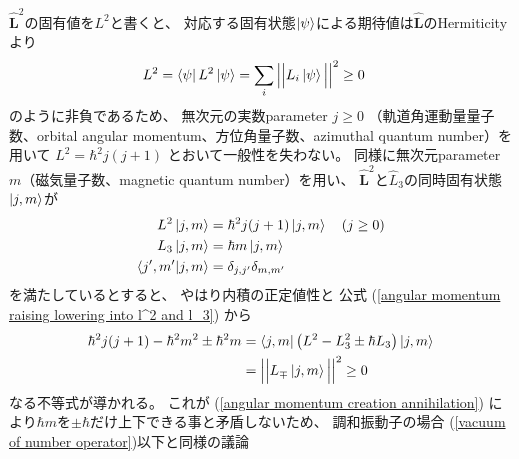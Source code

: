 $\hat{\bm{L}}^2$の固有値を$L^2$と書くと、
対応する固有状態$\ket{\psi}$による期待値は$\hat{\bm{L}}$のHermiticityより
\begin{align}
    L^2
&=
    \bra{\psi} L^2 \ket{\psi}
=
    \sum_i
    \Big|\Big|
        L_i \ket{\psi}
    \Big|\Big|^2 \ge 0
\end{align}
のように非負であるため、
無次元の実数parameter $j \ge 0$
（軌道角運動量量子数、orbital angular momentum、方位角量子数、azimuthal quantum number）を用いて
$L^2 = \hbar^2 j (j+1)$
とおいて一般性を失わない。
同様に無次元parameter $m$（磁気量子数、magnetic quantum number）を用い、
$\hat{\bm{L}}^2$と$\hat{L}_3$の同時固有状態$\ket{j,m}$が
\begin{subequations}
\begin{align}
    L^2 \ket{j,m}
    &=
    \hbar^2 j (j+1) \ket{j,m}
    \quad( j \ge 0 )
\\
    L_3 \ket{j,m}
    &=
    \hbar m \ket{j,m}
\\
    \braket{ j', m' | j, m }
    &=
    \delta_{j, j'} \delta_{m, m'}
\end{align}
\end{subequations}
を満たしているとすると、
やはり内積の正定値性と
公式
(\ref{angular momentum raising lowering into l^2 and l_3})
から
\begin{align}
    \hbar^2 j (j+1)
-
    \hbar^2 m^2
\pm \hbar^2 m
&=
    \bra{ j, m } \left(
        L^2
        -
        L_3^2
        \pm \hbar
        L_3
    \right)\ket{ j, m }
\notag\\&=
    \Big|\Big|
        L_\mp \ket{ j, m }
    \Big|\Big|^2
\ge
    0
\label{positive definiteness of angular momentuum}
\end{align}
なる不等式が導かれる。
これが
(\ref{angular momentum creation annihilation})
により$\hbar m$を$\pm \hbar$だけ上下できる事と矛盾しないため、
調和振動子の場合
(\ref{vacuum of number operator})以下と同様の議論
